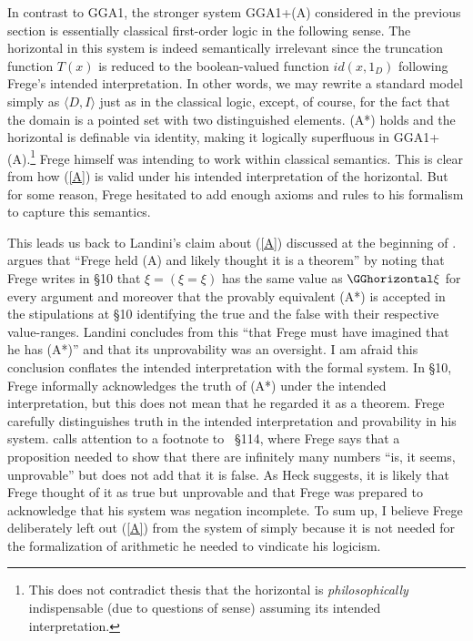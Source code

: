 \documentclass{preprint}
\newcommand{\GGA}{\textsf{GGA1}}
\begin{document}
In contrast to \GGA, the stronger system \GGA+(A) considered in the previous section is essentially classical first-order logic in the following sense. The horizontal in this system is indeed semantically irrelevant since the truncation function $T(x)$ is reduced to the boolean-valued function $id(x,1_D)$ following Frege's intended interpretation. 
In other words, we may rewrite a standard model simply as $\langle D, I \rangle$ just as in the classical logic, except, of course, for the fact that the domain is a pointed set with two distinguished elements. (A*) holds and the horizontal is definable via identity, making it logically superfluous in \GGA+(A).\footnote{
	This does not contradict  thesis that the horizontal is \textit{philosophically} indispensable (due to questions of sense) assuming its intended interpretation.
 }
Frege himself was intending to work within classical semantics. This is clear from how (\ref{A}) is valid under his intended interpretation of the horizontal. But for some reason, Frege hesitated to add enough axioms and rules to his formalism to capture this semantics. 


This leads us back to Landini's claim about (\ref{A}) discussed at the beginning of . 
\citet[\S4]{landini2022stipulations} argues that ``Frege held (A) and likely thought it is a theorem'' by noting that Frege writes in \S10 that $\xi = (\xi = \xi)$ has the same value as $\GGhorizontal \xi$ for every argument and moreover that the provably equivalent (A*) is accepted in the stipulations at \S10 identifying the true and the false with their respective value-ranges. Landini concludes from this ``that Frege must have imagined that he has (A*)'' and that its unprovability was an oversight. 
I am afraid this conclusion conflates the intended interpretation with the formal system. In \S10, Frege informally acknowledges the truth of (A*) under the intended interpretation, but this does not mean that he regarded it as a theorem. Frege carefully distinguishes truth in the intended interpretation and provability in his system. \citet[pp.~31--32]{heck2012reading} calls attention to a footnote to \gga~\S114, where Frege says that a proposition needed to show that there are infinitely many numbers ``is, it seems, unprovable'' but does not add that it is false. As Heck suggests, it is likely that Frege thought of it as true but unprovable and that Frege was prepared to acknowledge that his system was negation incomplete. To sum up, I believe Frege deliberately left out (\ref{A}) from the system of {\gga} simply because it is not needed for the formalization of arithmetic he needed to vindicate his logicism.
\end{document}
